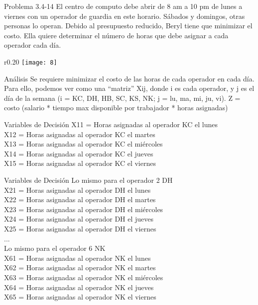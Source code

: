 \documentclass{beamer}
\begin{document}
\begin{frame}[t,fragile]{Problema 3.4-14 }
El centro de computo debe abrir de 8 am a 10 pm de lunes a viernes con un operador de guardia en este horario. Sábados y domingos, otras personas lo operan. Debido al presupuesto reducido, Beryl tiene que minimizar el costo. Ella quiere determinar el número de horas que debe asignar a cada operador cada día. \begin{wrapfigure}{r}{0.20\textwidth}
    \centering
    \texttt{[image: 8]}
\end{wrapfigure}

\end{frame}
\begin{frame}{Análisis}
Se requiere minimizar el costo  de las horas de cada operador en cada día. 
Para ello, podemos ver como una “matriz” Xij, donde  i es cada operador, y j es el día de la semana (i = KC, DH, HB, SC, KS, NK;  j = lu, ma, mi, ju, vi).
Z = costo (salario * tiempo max disponible por trabajador * horas asignadas)

\end{frame}

\begin{frame}[fragile]{Variables de Decisión}
X11 =  Horas asignadas al operador KC el lunes\\
X12 = Horas asignadas al operador KC el martes\\
X13 =  Horas asignadas al operador KC el miércoles\\
X14    = Horas asignadas al operador KC el jueves\\
X15 =  Horas asignadas al operador KC el viernes\\
\end{frame}
\begin{frame}[fragile]{Variables de Decisión}
Lo mismo para  el operador 2 DH\\
X21 =  Horas asignadas al operador DH el lunes\\
X22    = Horas asignadas al operador DH el martes\\
X23 =  Horas asignadas al operador DH el miércoles\\
X24    = Horas asignadas al operador DH el jueves\\
X25 =  Horas asignadas al operador DH el viernes\\

...\\
Lo mismo para el operador 6 NK\\
    X61 =  Horas asignadas al operador NK el lunes\\
X62    = Horas asignadas al operador NK el martes\\
X63 =  Horas asignadas al operador NK el miércoles\\
X64    = Horas asignadas al operador NK el jueves\\
X65 =  Horas asignadas al operador NK el viernes\\


\end{frame}
\end{document}
